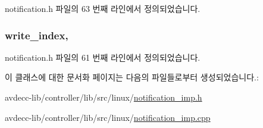 notification.\+h 파일의 63 번째 라인에서 정의되었습니다.

\subsubsection[{\texorpdfstring{write\+\_\+index}{write_index}}]{ write\+\_\+index\hspace{0.3cm}{\ttfamily [protected]}, {\ttfamily [inherited]}}\hypertarget{classavdecc__lib_1_1notification_a44d246646acf5f95a78a87d606f22a42}{}\label{classavdecc__lib_1_1notification_a44d246646acf5f95a78a87d606f22a42}


notification.\+h 파일의 61 번째 라인에서 정의되었습니다.



이 클래스에 대한 문서화 페이지는 다음의 파일들로부터 생성되었습니다.\+:\begin{DoxyCompactItemize}
\item 
avdecc-\/lib/controller/lib/src/linux/\hyperlink{linux_2notification__imp_8h}{notification\+\_\+imp.\+h}\item 
avdecc-\/lib/controller/lib/src/linux/\hyperlink{linux_2notification__imp_8cpp}{notification\+\_\+imp.\+cpp}\end{DoxyCompactItemize}
